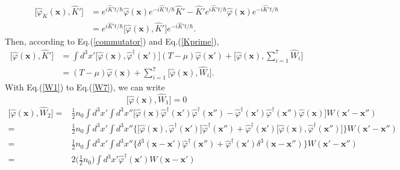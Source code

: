 \documentclass[12pt]{article}
\begin{document}
\noindent\hrulefill
\begin{equation}
    \begin{split}
        \big[\hat{\varphi}_K(\mathbf{x}),\hat{K}'\big]&=e^{i\hat{K}'t/\hbar}
        \hat{\varphi}(\mathbf{x})e^{-i\hat{K}'t/\hbar}\hat{K}'-\hat{K}'e^{i\hat{K}'t
        /\hbar}\hat{\varphi}(\mathbf{x})e^{-i\hat{K}'t/\hbar}\\
        &=e^{i\hat{K}'t/\hbar}\big[\hat{\varphi}(\mathbf{x}),\hat{K}'\big]
        e^{-i\hat{K}'t/\hbar}.
    \end{split}
\end{equation}
Then, according to Eq.(\ref{commutator}) and Eq.(\ref{Kprime}),
\begin{equation}\label{cmK}
    \begin{split}
        \big[\hat{\varphi}(\mathbf{x}),\hat{K}'\big]&=\int d^3x'\big[\hat{\varphi}
        (\mathbf{x}),\hat{\varphi}^\dagger(\mathbf{x}')\big](T-\mu)\hat{\varphi}
        (\mathbf{x}')+\Big[\hat{\varphi}(\mathbf{x}),\sum_{i=1}^7\hat{W}_i\Big]\\
        &=(T-\mu)\hat{\varphi}(\mathbf{x})+\sum_{i=1}^7\big[\hat{\varphi}(\mathbf{x}),
        \hat{W}_i\big].
    \end{split}
\end{equation}
With Eq.(\ref{W1}) to Eq.(\ref{W7}), we can write 
\begin{equation}\label{cm1}
    \big[\hat{\varphi}(\mathbf{x}),\hat{W}_1\big]=0
\end{equation}
\begin{equation}
    \begin{split}
        \big[\hat{\varphi}(\mathbf{x}),\hat{W}_2\big]=&\frac{1}{2}n_0\int d^3x'
        \int d^3x''\big[\hat{\varphi}(\mathbf{x})\hat{\varphi}^\dagger(\mathbf{x}')
        \hat{\varphi}^\dagger(\mathbf{x}'')-\hat{\varphi}^\dagger(\mathbf{x}')
        \hat{\varphi}^\dagger(\mathbf{x}'')\hat{\varphi}(\mathbf{x})\big]W(\mathbf{x}'
        -\mathbf{x}'')\\
        =&\frac{1}{2}n_0\int d^3x'\int d^3x''\big\{\big[\hat{\varphi}(\mathbf{x}),
        \hat{\varphi}^\dagger(\mathbf{x}')\big]\hat{\varphi}^\dagger(\mathbf{x}'')
        +\hat{\varphi}^\dagger(\mathbf{x}')\big[\hat{\varphi}(\mathbf{x}),
        \hat{\varphi}^\dagger(\mathbf{x}'')\big]\big\}W(\mathbf{x}'-\mathbf{x}'')\\
        =&\frac{1}{2}n_0\int d^3x'\int d^3x''\big\{\delta^3(\mathbf{x}-\mathbf{x}')
        \hat{\varphi}^\dagger(\mathbf{x}'')+\hat{\varphi}^\dagger(\mathbf{x}')
        \delta^3(\mathbf{x}-\mathbf{x}'')\big\}W(\mathbf{x}'-\mathbf{x}'')\\
        =&2\Big(\frac{1}{2}n_0\Big)\int d^3x'\hat{\varphi}^\dagger(\mathbf{x}')
        W(\mathbf{x}-\mathbf{x}')
    \end{split}
\end{equation}
\end{document}
